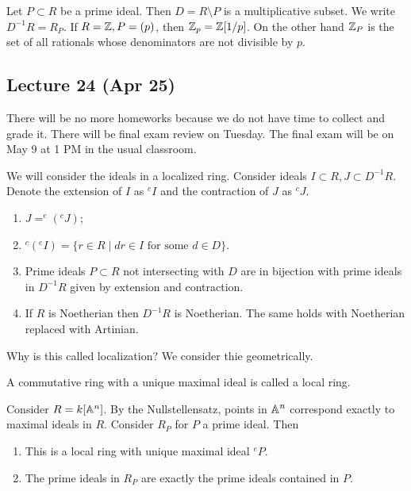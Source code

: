 \documentclass[10pt, twoside]{article}
\begin{document}
        \begin{exm}
            Let $P \subset R$ be a prime ideal. Then $D = R \setminus P$ is a multiplicative subset. We write $D^{-1}R = R_P$. If $R = \mathbb{Z}, P = (p)$, then $\mathbb{Z}_p = \mathbb{Z}[1/p]$. On the other hand $\mathbb{Z}_P$ is the set of all rationals whose denominators are not divisible by $p$.
        \end{exm}

        \subsection{Lecture 24 (Apr 25)}
        There will be no more homeworks because we do not have time to collect and grade it. There will be final exam review on Tuesday. The final exam will be on May 9 at 1 PM in the usual classroom.

        We will consider the ideals in a localized ring. Consider ideals $I \subset R, J \subset D^{-1}R$. Denote the extension of $I$ as $^eI$ and the contraction of $J$ as $^cJ$.

        \begin{prop}
            \begin{enumerate}
                \item $J = ^e(^cJ)$;
                \item $^c(^eI) = \{r \in R \mid dr \in I \text{ for some } d \in D \}$.
                \item Prime ideals $P \subset R$ not intersecting with $D$ are in bijection with prime ideals in $D^{-1}R$ given by extension and contraction.
                \item If $R$ is Noetherian then $D^{-1}R$ is Noetherian. The same holds with Noetherian replaced with Artinian.
            \end{enumerate}
        \end{prop}
        
        Why is this called localization? We consider thie geometrically.
        \begin{defn}
            A commutative ring with a unique maximal ideal is called a local ring.
        \end{defn}

        Consider $R = k[\mathbb{A}^n]$. By the Nullstellensatz, points in $\mathbb{A}^n$ correspond exactly to maximal ideals in $R$. Consider $R_P$ for $P$ a prime ideal. Then
        \begin{enumerate}
            \item This is a local ring with unique maximal ideal $^eP$. 
            \item The prime ideals in $R_P$ are exactly the prime ideals contained in $P$.
        \end{enumerate}
\end{document}
